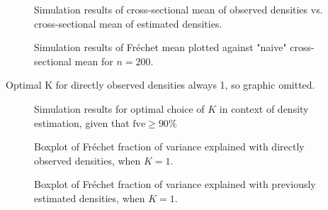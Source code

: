 \begin{figure}[h]
    \centering
    
    \caption{Simulation results of cross-sectional mean of observed densities vs.
    cross-sectional mean of estimated densities.}
    \label{fig:sim_cs_denstimation}
\end{figure}

\begin{figure}[h]
    \centering
    
    \caption{Simulation results of Fréchet mean plotted against "naive" cross-sectional mean for
    $n = 200$.}
    \label{fig:sim_f_vs_cs}
\end{figure}

Optimal K for directly observed densities always 1, so graphic omitted.

\begin{figure}[h]
    \centering
    
    \caption{Simulation results for optimal choice of $K$ in context of density estimation,
    given that $\text{fve} \geq 90 \%$}
    \label{fig:sim_k_opt_denstimation}
\end{figure}

\begin{figure}[h]
    \centering
    
    \caption{Boxplot of Fréchet fraction of variance explained with directly observed
    densities, when $K = 1$.}
    \label{fig:sim_fve}
\end{figure}

\begin{figure}[h]
    \centering
    
    \caption{Boxplot of Fréchet fraction of variance explained with previously estimated
    densities, when $K = 1$.}
    \label{fig:sim_fve_denstimation}
\end{figure}

